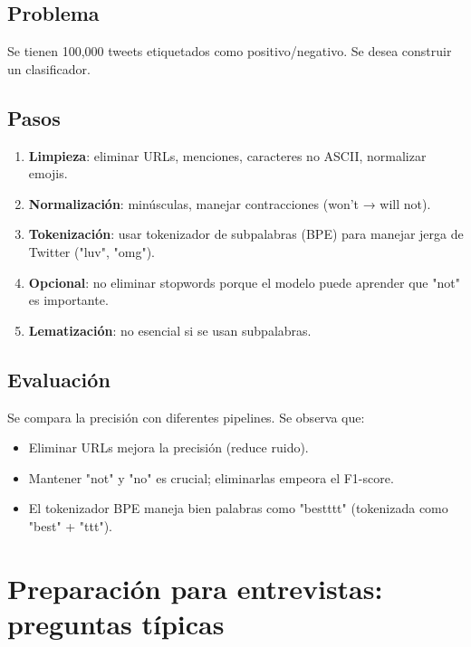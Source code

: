 \documentclass[12pt,a4paper,openany,oneside]{book}
\begin{document}
\subsection{Problema}
Se tienen 100,000 tweets etiquetados como positivo/negativo. Se desea construir un clasificador.

\subsection{Pasos}
\begin{enumerate}
    \item \textbf{Limpieza}: eliminar URLs, menciones, caracteres no ASCII, normalizar emojis.
    \item \textbf{Normalización}: minúsculas, manejar contracciones (won't → will not).
    \item \textbf{Tokenización}: usar tokenizador de subpalabras (BPE) para manejar jerga de Twitter ("luv", "omg").
    \item \textbf{Opcional}: no eliminar stopwords porque el modelo puede aprender que "not" es importante.
    \item \textbf{Lematización}: no esencial si se usan subpalabras.
\end{enumerate}

\subsection{Evaluación}
Se compara la precisión con diferentes pipelines. Se observa que:
\begin{itemize}
    \item Eliminar URLs mejora la precisión (reduce ruido).
    \item Mantener "not" y "no" es crucial; eliminarlas empeora el F1-score.
    \item El tokenizador BPE maneja bien palabras como "bestttt" (tokenizada como "best" + "ttt").
\end{itemize}

\section{Preparación para entrevistas: preguntas típicas}
\end{document}
